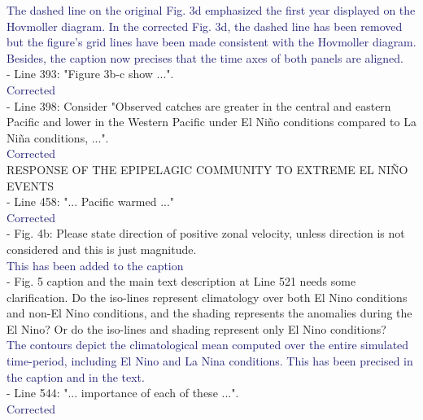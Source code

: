 \documentclass[12pt]{article}
\newcommand{\resp}[1]{\textcolor{MidnightBlue}{#1}}
\begin{document}
\resp{The dashed line on the original Fig. 3d emphasized the first year displayed on the Hovmoller diagram. In the corrected Fig. 3d, the dashed line has been removed but the figure's grid lines have been made consistent with the Hovmoller diagram. Besides, the caption now precises that the time axes of both panels are aligned.} \\

- Line 393: "Figure 3b-c show ...".\\

\resp{Corrected} \\

- Line 398: Consider "Observed catches are greater in the central and eastern Pacific and lower in the Western Pacific under El Niño conditions compared to La Niña conditions, ...".\\

\resp{Corrected} \\

RESPONSE OF THE EPIPELAGIC COMMUNITY TO EXTREME EL NIÑO EVENTS\\

- Line 458: "... Pacific warmed ..."\\

\resp{Corrected} \\

- Fig. 4b: Please state direction of positive zonal velocity, unless direction is not considered and this is just magnitude.\\

\resp{This has been added to the caption} \\

- Fig. 5 caption and the main text description at Line 521 needs some clarification. Do the iso-lines represent climatology over both El Nino conditions and non-El Nino conditions, and the shading represents the anomalies during the El Nino? Or do the iso-lines and shading represent only El Nino conditions?\\

\resp{The contours depict the climatological mean computed over the entire simulated time-period,  including El Nino and La Nina conditions. This has been precised in the caption and in the text.} \\

- Line 544: "... importance of each of these ...".\\

\resp{Corrected}\\
\end{document}
